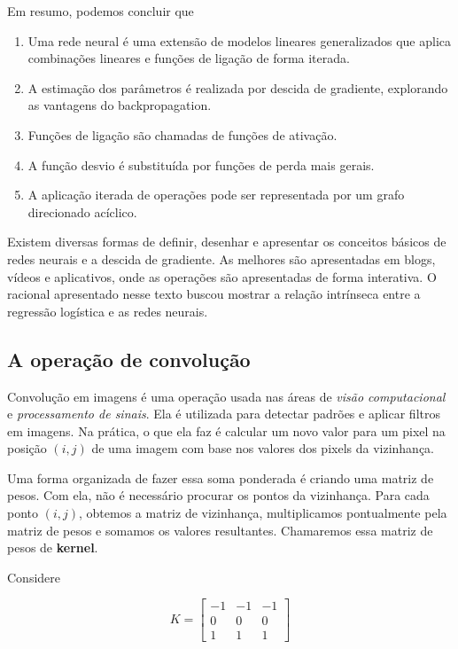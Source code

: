 \documentclass[12pt,]{report}
\providecommand{\tightlist}{%
  \setlength{\itemsep}{0pt}\setlength{\parskip}{0pt}}
\begin{document}
Em resumo, podemos concluir que

\begin{enumerate}
\def\labelenumi{\arabic{enumi}.}
\tightlist
\item
  Uma rede neural é uma extensão de modelos lineares generalizados que aplica combinações lineares e funções de ligação de forma iterada.
\item
  A estimação dos parâmetros é realizada por descida de gradiente, explorando as vantagens do backpropagation.
\item
  Funções de ligação são chamadas de funções de ativação.
\item
  A função desvio é substituída por funções de perda mais gerais.
\item
  A aplicação iterada de operações pode ser representada por um grafo direcionado acíclico.
\end{enumerate}

Existem diversas formas de definir, desenhar e apresentar os conceitos básicos de redes neurais e a descida de gradiente. As melhores são apresentadas em blogs, vídeos e aplicativos, onde as operações são apresentadas de forma interativa. O racional apresentado nesse texto buscou mostrar a relação intrínseca entre a regressão logística e as redes neurais.

\hypertarget{a-operauxe7uxe3o-de-convoluuxe7uxe3o}{%
\subsection{A operação de convolução}\label{a-operauxe7uxe3o-de-convoluuxe7uxe3o}}

Convolução em imagens é uma operação usada nas áreas de \emph{visão computacional} e \emph{processamento de sinais}. Ela é utilizada para detectar padrões e aplicar filtros em imagens. Na prática, o que ela faz é calcular um novo valor para um pixel na posição \((i,j)\) de uma imagem com base nos valores dos pixels da vizinhança.

Uma forma organizada de fazer essa soma ponderada é criando uma matriz de pesos. Com ela, não é necessário procurar os pontos da vizinhança. Para cada ponto \((i,j)\), obtemos a matriz de vizinhança, multiplicamos pontualmente pela matriz de pesos e somamos os valores resultantes. Chamaremos essa matriz de pesos de \textbf{kernel}.

Considere

\[
K = \left[\begin{array}{rrr}-1&-1&-1\\0&0&0\\1&1&1\end{array}\right]
\]
\end{document}

